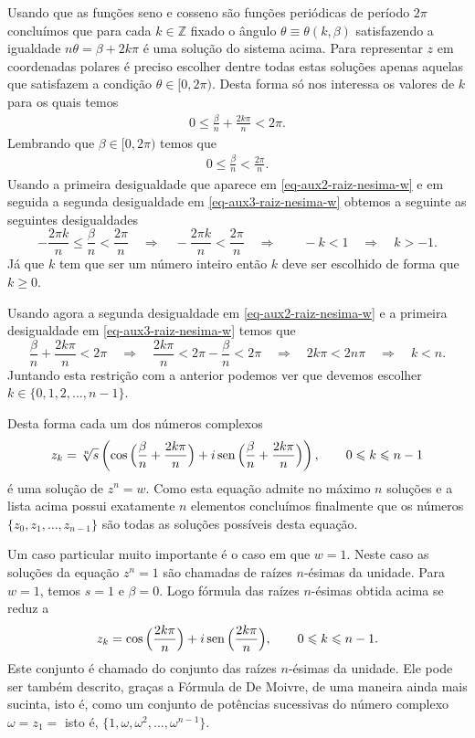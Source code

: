 Usando que as funções seno e cosseno são funções periódicas de período $2\pi$
concluímos que para cada $k\in\mathbb{Z}$ fixado o ângulo $\theta\equiv \theta(k,\beta)$ 
satisfazendo a igualdade $n\theta = \beta + 2k\pi$ é uma solução do sistema acima.
Para representar $z$ em coordenadas polares é preciso escolher dentre todas estas 
soluções apenas aquelas que satisfazem a condição $\theta\in [0,2\pi)$.
Desta forma só nos interessa os valores de $k$ para os quais 
temos 
\begin{align}\label{eq-aux2-raiz-nesima-w}
0\leqslant \frac{\beta}{n}+ \frac{2k\pi}{n}<2\pi. 
\end{align}
Lembrando que $\beta\in [0,2\pi)$ temos que 
\begin{align}\label{eq-aux3-raiz-nesima-w}
0\leqslant \frac{\beta}{n}<\frac{2\pi}{n}.
\end{align}
Usando a primeira desigualdade que aparece em \eqref{eq-aux2-raiz-nesima-w} e em seguida
a segunda desigualdade em \eqref{eq-aux3-raiz-nesima-w} obtemos a seguinte as seguintes desigualdades
\[
-\frac{2\pi k}{n}\leqslant \frac{\beta}{n}<\frac{2\pi}{n}
\quad \Longrightarrow \quad 
-\frac{2\pi k}{n}<\frac{2\pi}{n}
\quad \Longrightarrow \quad
\quad -k<1\quad 
\Longrightarrow \quad 
k>-1.
\]
Já que $k$ tem que ser um número inteiro então $k$ deve ser escolhido de forma que 
$k\geqslant 0$. 

Usando agora a segunda desigualdade em \eqref{eq-aux2-raiz-nesima-w} e a primeira 
desigualdade em \eqref{eq-aux3-raiz-nesima-w} temos que 
\[
\frac{\beta}{n}+ \frac{2k\pi}{n}<2\pi
\quad \Longrightarrow \quad 
\frac{2k\pi}{n}<2\pi-\frac{\beta}{n}
<
2\pi
\quad \Longrightarrow \quad 
2k\pi<2n\pi
\quad \Longrightarrow \quad 
k<n.
\]
Juntando esta restrição com a anterior podemos ver que devemos escolher $k\in \{0,1,2,\ldots,n-1\}$.


Desta forma cada um dos números complexos 
\begin{align}\label{eq-sol-ZN=w}
z_k = 
\sqrt[n]{s}
	\left(
		\cos\Big(\frac{\beta}{n}+ \frac{2k\pi}{n}\Big)+i\operatorname{sen}\Big(\frac{\beta}{n}+ \frac{2k\pi}{n}\Big)
	\right),
	\qquad 0\leqslant k\leqslant n-1
\end{align}
é uma solução de $z^n=w$. Como esta equação admite no máximo $n$ soluções e a lista acima 
possui exatamente $n$ elementos concluímos finalmente que os 
números $\{z_0,z_1,\ldots, z_{n-1}\}$ são todas as soluções possíveis desta equação. 


Um caso particular muito importante é o caso em que $w=1$. Neste caso as soluções da equação 
$z^n=1$ são chamadas de raízes $n$-ésimas da unidade. 
Para $w=1$, temos $s=1$ e $\beta=0$. 
Logo fórmula das raízes $n$-ésimas obtida acima se reduz a 
\[
z_k = 
		\cos\Big(\frac{2k\pi}{n}\Big)+i\operatorname{sen}\Big(\frac{2k\pi}{n}\Big),
	\qquad 0\leqslant k\leqslant n-1.
\]
Este conjunto é chamado do conjunto das raízes $n$-ésimas da unidade. 
Ele pode ser também descrito, graças a Fórmula de De Moivre, 
de uma maneira ainda mais sucinta, isto é, como um conjunto de potências
sucessivas do número complexo 
$\omega = z_1 = $
isto é, $\{1,\omega,\omega^{2},\ldots,\omega^{n-1}\}$.



